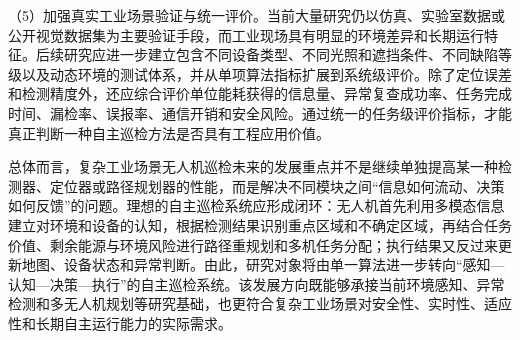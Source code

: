 （5）加强真实工业场景验证与统一评价。当前大量研究仍以仿真、实验室数据或公开视觉数据集为主要验证手段，而工业现场具有明显的环境差异和长期运行特征。后续研究应进一步建立包含不同设备类型、不同光照和遮挡条件、不同缺陷等级以及动态环境的测试体系，并从单项算法指标扩展到系统级评价。除了定位误差和检测精度外，还应综合评价单位能耗获得的信息量、异常复查成功率、任务完成时间、漏检率、误报率、通信开销和安全风险。通过统一的任务级评价指标，才能真正判断一种自主巡检方法是否具有工程应用价值。

总体而言，复杂工业场景无人机巡检未来的发展重点并不是继续单独提高某一种检测器、定位器或路径规划器的性能，而是解决不同模块之间“信息如何流动、决策如何反馈”的问题。理想的自主巡检系统应形成闭环：无人机首先利用多模态信息建立对环境和设备的认知，根据检测结果识别重点区域和不确定区域，再结合任务价值、剩余能源与环境风险进行路径重规划和多机任务分配；执行结果又反过来更新地图、设备状态和异常判断。由此，研究对象将由单一算法进一步转向“感知—认知—决策—执行”的自主巡检系统。该发展方向既能够承接当前环境感知、异常检测和多无人机规划等研究基础，也更符合复杂工业场景对安全性、实时性、适应性和长期自主运行能力的实际需求。




